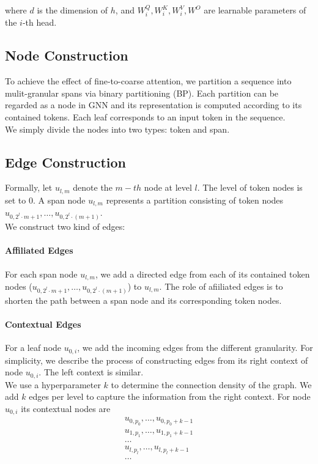 where $d$ is the dimension of $h$, and $W_i^Q, W_i^K, W_i^V, W^O$ are learnable
parameters of the $i$-th head.

\subsection{Node Construction}

To achieve the effect of fine-to-coarse attention, we partition a sequence into
mulit-granular spans via binary partitioning (BP). Each partition can be
regarded as a node in GNN and its representation is computed according to its
contained tokens. Each leaf corresponds to an input token in the sequence.\\
We simply divide the nodes into two types: token and span.

\subsection{Edge Construction}

Formally, let $u_{l, m}$ denote the $m-th$ node at level $l$. The level of token
nodes is set to 0. A span node $u_{l, m}$ represents a partition consisting of
token nodes $u_{0, 2^l \cdot m + 1}, \dots, u_{0, 2^l \cdot (m + 1)}$.\\
We construct two kind of edges:

\paragraph{Affiliated Edges} For each span node $u_{l, m}$, we add a directed
edge from each of its contained token nodes ($u_{0, 2^l \cdot m + 1}, \dots,
u_{0, 2^l \cdot (m + 1)}$) to $u_{l, m}$. The role of afiiliated edges is to
shorten the path between a span node and its corresponding token nodes.

\paragraph{Contextual Edges} For a leaf node $u_{0, i}$, we add the incoming
edges from the different granularity. For simplicity, we describe the process of
constructing edges from its right context of node $u_{0, i}$. The left context
is similar.\\
We use a hyperparameter $k$ to determine the connection density of the graph. We
add $k$ edges per level to capture the information from the right context. For
node $u_{0, i}$ its contextual nodes are 
\begin{align*}
    u_{0, p_0}, \dots, u_{0, p_0 + k-1} \\
    u_{1, p_1}, \dots, u_{1, p_1 + k-1} \\
    \dots \\
    u_{l, p_l}, \dots, u_{l, p_l + k-1} \\
    \dots
\end{align*}

